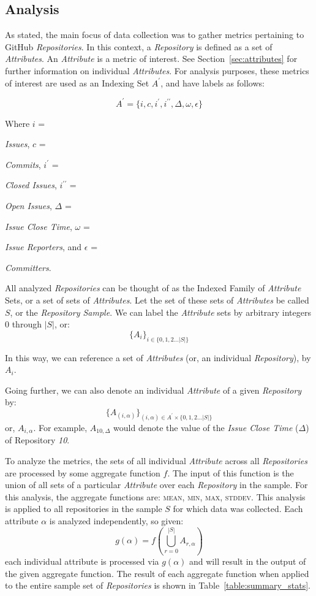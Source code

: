 \documentclass{proc}
\begin{document}
\subsection{Analysis}
As stated, the main focus of data collection was to gather metrics pertaining to GitHub \textit{Repositories}. In this context, a \textit{Repository} is defined as a set of \textit{Attributes}. An \textit{Attribute} is a metric of interest. See Section~\ref{sec:attributes} for further information on individual \textit{Attributes}. For analysis purposes, these metrics of interest are used as an Indexing Set $A^\prime$, and have labels as follows:

\[A^\prime = \{i, c, i^\prime, i^{\prime\prime}, \Delta, \omega, \epsilon\}\]

Where $i$ = {\textit{Issues}, $c$ = {\textit{Commits}, $i^\prime$ = {\textit{Closed Issues}, $i^{\prime\prime}$ = {\textit{Open Issues}, $\Delta$ = {\textit{Issue Close Time}, $\omega$ = {\textit{Issue Reporters}, and $\epsilon$ = {\textit{Committers}.

All analyzed \textit{Repositories} can be thought of as the Indexed Family of \textit{Attribute} Sets, or a set of sets of \textit{Attributes}. Let the set of these sets of \textit{Attributes} be called $S$, or the \textit{Repository Sample}. We can label the \textit{Attribute} sets by arbitrary integers 0 through $|S|$, or:
\[ \{A_i\}_{i \in \{0,1,2 ... |S|\} }\]

In this way, we can reference a set of \textit{Attributes} (or, an individual \textit{Repository}), by $A_i$. 

Going further, we can also denote an individual \textit{Attribute} of a given \textit{Repository} by:
\[ \{A_{(i,\alpha)}\}_{(i,\alpha) \in A^\prime \times \{0,1,2 ... |S|\} } \]
or, $A_{i,\alpha}$. For example, $A_{10,\Delta}$ would denote the value of the \textit{Issue Close Time} ($\Delta$) of Repository \textit{10}.

To analyze the metrics, the sets of all individual \textit{Attribute} across all \textit{Repositories} are processed by some aggregate function $f$. The input of this function is the union of all sets of a particular \textit{Attribute} over each \textit{Repository} in the sample. For this analysis, the aggregate functions are: \textsc{mean}, \textsc{min}, \textsc{max}, \textsc{stddev}. This analysis is applied to all repositories in the sample $S$ for which data was collected. Each attribute $\alpha$ is analyzed independently, so given:
\[ g(\alpha) =f \left( \bigcup\limits_{r = 0}^{|S|}  A_{r,\alpha} \right) \]
each individual attribute is processed via $g(\alpha)$ and will result in the output of the given aggregate function. The result of each aggregate function when applied to the entire sample set of \textit{Repositories} is shown in Table~\ref{table:summary_stats}.

}}}}}}}
\end{document}
